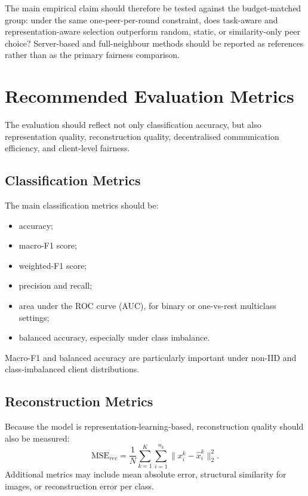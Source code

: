 \documentclass[conference]{IEEEtran}
\begin{document}
The main empirical claim should therefore be tested against the budget-matched group: under the same one-peer-per-round constraint, does task-aware and representation-aware selection outperform random, static, or similarity-only peer choice? Server-based and full-neighbour methods should be reported as references rather than as the primary fairness comparison.

\section{Recommended Evaluation Metrics}
\label{sec:recommended-evaluation-metrics}

The evaluation should reflect not only classification accuracy, but also representation quality, reconstruction quality, decentralised communication efficiency, and client-level fairness.

\subsection{Classification Metrics}
\label{subsec:classification-metrics}
The main classification metrics should be:
\begin{itemize}
    \item accuracy;
    \item macro-F1 score;
    \item weighted-F1 score;
    \item precision and recall;
    \item area under the ROC curve (AUC), for binary or one-vs-rest multiclass settings;
    \item balanced accuracy, especially under class imbalance.
\end{itemize}

Macro-F1 and balanced accuracy are particularly important under non-IID and class-imbalanced client distributions.

\subsection{Reconstruction Metrics}
\label{subsec:reconstruction-metrics}
Because the model is representation-learning-based, reconstruction quality should also be measured:
\begin{equation}
    \text{MSE}_{rec}
    =
    \frac{1}{N}
    \sum_{k=1}^{K}
    \sum_{i=1}^{n_k}
    \|x_i^k-\hat{x}_i^k\|_2^2.
    \label{eq:auto-096}
\end{equation}
Additional metrics may include mean absolute error, structural similarity for images, or reconstruction error per class.
\end{document}
